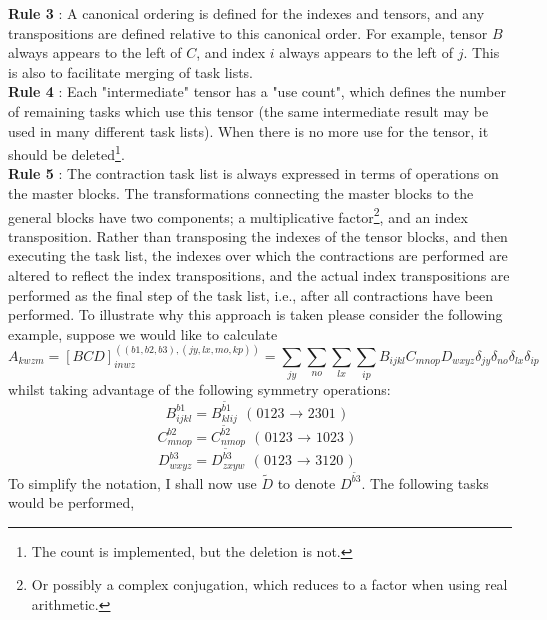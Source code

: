 \noindent \textbf{Rule 3} : A canonical ordering is defined for the indexes and tensors, and
any transpositions are defined relative to this canonical order. For example, tensor
$B$ always appears to the left of $C$, and index $i$ always appears to the left
of $j$. This is also to facilitate merging of task lists.\\

\noindent \textbf{Rule 4} : Each "intermediate" tensor has a
"use count", which defines the number of remaining tasks which use this tensor (the
same intermediate result may be used in many different task lists). When there is 
no more use for the tensor, it should be deleted\footnote{The count is
implemented, but the deletion is not.}.\\

\noindent \textbf{Rule 5} : The contraction task list is always expressed in terms
of operations on the master blocks.  The
transformations connecting the master blocks to the general blocks have two
components; a multiplicative factor\footnote{Or possibly a complex conjugation,
which reduces to a factor when using real arithmetic.}, and an index
transposition.  Rather than transposing the indexes of the tensor blocks, and
then executing the task list, the indexes over which the contractions are
performed are altered to reflect the index transpositions, and the actual
index transpositions are performed as the final step of the task list, i.e.,
after all contractions have been performed. To illustrate why
this approach is taken please consider the following example, suppose we would
like to calculate
\begin{equation}
A_{kwzm} = 
[BCD]^{((b1,b2,b3),(jy,lx,mo,kp))}_{inwz} = \sum_{jy}\sum_{no}\sum_{lx}\sum_{ip} B_{ijkl}C_{mnop}D_{wxyz} \delta_{jy} \delta_{no} \delta_{lx}\delta_{ip}
\end{equation}
whilst taking advantage of the following symmetry operations:
\begin{equation*}
B_{ijkl}^{b1} = B_{klij}^{\tilde{b1}}  \text{ \ \ ( 0123 $\rightarrow$ 2301 ) }
\end{equation*}
\begin{equation*}
C_{mnop}^{b2} = C_{nmop}^{\tilde{b2}}  \text{ \ \ ( 0123 $\rightarrow$ 1023 ) }
\end{equation*}
\begin{equation*}
D_{wxyz}^{b3} = D_{zxyw}^{\tilde{b3}}  \text{ \ \ ( 0123 $\rightarrow$ 3120 ) }
\end{equation*}
To simplify the notation, I shall now use $\tilde{D}$ to denote $D^{\tilde{b3}}$. The following tasks would be performed,
